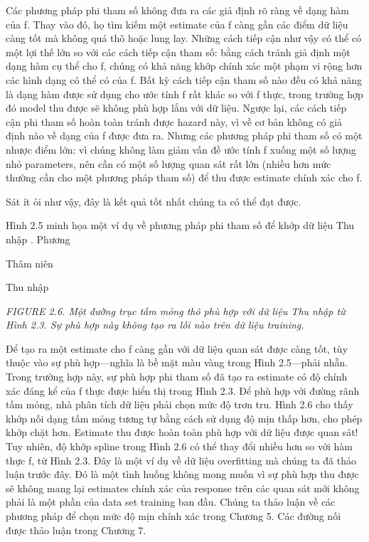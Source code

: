 Các phương pháp phi tham số không đưa ra các giả định rõ ràng về dạng hàm của f. Thay vào đó, họ tìm kiếm một estimate của f càng gần các điểm dữ liệu càng tốt mà không quá thô hoặc lung lay. Những cách tiếp cận như vậy có thể có một lợi thế lớn so với các cách tiếp cận tham số: bằng cách tránh giả định một dạng hàm cụ thể cho f, chúng có khả năng khớp chính xác một phạm vi rộng hơn các hình dạng có thể có của f. Bất kỳ cách tiếp cận tham số nào đều có khả năng là dạng hàm được sử dụng cho ước tính f rất khác so với f thực, trong trường hợp đó model thu được sẽ không phù hợp lắm với dữ liệu. Ngược lại, các cách tiếp cận phi tham số hoàn toàn tránh được hazard này, vì về cơ bản không có giả định nào về dạng của f được đưa ra. Nhưng các phương pháp phi tham số có một nhược điểm lớn: vì chúng không làm giảm vấn đề ước tính f xuống một số lượng nhỏ parameters, nên cần có một số lượng quan sát rất lớn (nhiều hơn mức thường cần cho một phương pháp tham số) để thu được estimate chính xác cho f.

Sát ít ỏi như vậy, đây là kết quả tốt nhất chúng ta có thể đạt được.

Hình 2.5 minh họa một ví dụ về phương pháp phi tham số để khớp dữ liệu Thu nhập . Phương

Thâm niên

Thu nhập

\noindent\textit{FIGURE 2.6. Một đường trục tấm mỏng thô phù hợp với dữ liệu Thu nhập từ Hình 2.3. Sự phù hợp này không tạo ra lỗi nào trên dữ liệu training.}

Để tạo ra một estimate cho f càng gần với dữ liệu quan sát được càng tốt, tùy thuộc vào sự phù hợp—nghĩa là bề mặt màu vàng trong Hình 2.5—phải nhẵn. Trong trường hợp này, sự phù hợp phi tham số đã tạo ra estimate có độ chính xác đáng kể của f thực được hiển thị trong Hình 2.3. Để phù hợp với đường rãnh tấm mỏng, nhà phân tích dữ liệu phải chọn mức độ trơn tru. Hình 2.6 cho thấy khớp nối dạng tấm mỏng tương tự bằng cách sử dụng độ mịn thấp hơn, cho phép khớp chặt hơn. Estimate thu được hoàn toàn phù hợp với dữ liệu được quan sát! Tuy nhiên, độ khớp spline trong Hình 2.6 có thể thay đổi nhiều hơn so với hàm thực f, từ Hình 2.3. Đây là một ví dụ về dữ liệu overfitting mà chúng ta đã thảo luận trước đây. Đó là một tình huống không mong muốn vì sự phù hợp thu được sẽ không mang lại estimates chính xác của response trên các quan sát mới không phải là một phần của data set training ban đầu. Chúng ta thảo luận về các phương pháp để chọn mức độ mịn chính xác trong Chương 5. Các đường nối được thảo luận trong Chương 7.

